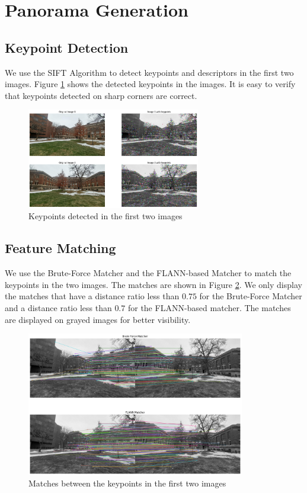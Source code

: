 \documentclass[10pt]{article}
\begin{document}
    \section*{\textbf{Panorama Generation}}

    \subsection*{\textbf{Keypoint Detection}}
    We use the SIFT Algorithm to detect keypoints and descriptors in the first two
    images. Figure \ref{fig:keypoints} shows the detected keypoints in the images.
    It is easy to verify that keypoints detected on sharp corners are correct.
    \begin{figure}[h]
        \centering
        \includegraphics[width=0.675\textwidth]{Assets/keypoints.png}
        \caption{Keypoints detected in the first two images}
        \label{fig:keypoints}
    \end{figure}

    \subsection*{\textbf{Feature Matching}}
    We use the Brute-Force Matcher and the FLANN-based Matcher to match the
    keypoints in the two images. The matches are shown in Figure \ref{fig:matches}.
    We only display the matches that have a distance ratio less than $0.75$ for
    the Brute-Force Matcher and a distance ratio less than $0.7$ for the FLANN-based
    matcher. The matches are displayed on grayed images for better visibility.
    \begin{figure}[h]
        \centering
        \includegraphics[width=0.85\textwidth]{Assets/matches.png}
        \caption{Matches between the keypoints in the first two images}
        \label{fig:matches}
    \end{figure}
\end{document}
